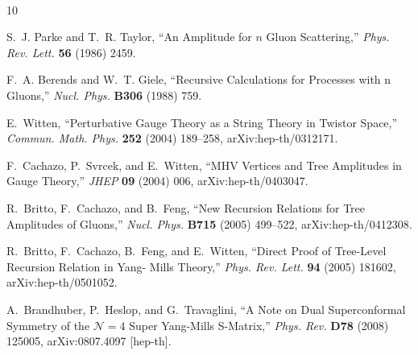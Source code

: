 \documentclass[11pt, reqno]{article}
\begin{document}
~\newpage~\newpage
~\vspace{0.2cm}~

%
%
%


\providecommand{\href}[2]{#2}\begingroup\raggedright\begin{thebibliography}{10}

S.~J. Parke and T.~R. Taylor, ``{An Amplitude for $n$ Gluon Scattering},''
\href{http://dx.doi.org/10.1103/PhysRevLett.56.2459}{{\em Phys. Rev. Lett.}
  {\bf 56} (1986)  2459}.

F.~A. Berends and W.~T. Giele, ``{Recursive Calculations for Processes with n
  Gluons},''
\href{http://dx.doi.org/10.1016/0550-3213(88)90442-7}{{\em Nucl. Phys.} {\bf
  B306} (1988)  759}.

E.~Witten, ``{Perturbative Gauge Theory as a String Theory in Twistor Space},''
  \href{http://dx.doi.org/10.1007/s00220-004-1187-3}{{\em Commun. Math. Phys.}
  {\bf 252} (2004)  189--258},
\href{http://arxiv.org/abs/hep-th/0312171}{{ arXiv:hep-th/0312171}}.

F.~Cachazo, P.~Svrcek, and E.~Witten, ``{MHV Vertices and Tree Amplitudes in
  Gauge Theory},'' \href{http://dx.doi.org/10.1088/1126-6708/2004/09/006}{{\em
  JHEP} {\bf 09} (2004)  006},
\href{http://arxiv.org/abs/hep-th/0403047}{{ arXiv:hep-th/0403047}}.

R.~Britto, F.~Cachazo, and B.~Feng, ``{New Recursion Relations for Tree
  Amplitudes of Gluons},''
  \href{http://dx.doi.org/10.1016/j.nuclphysb.2005.02.030}{{\em Nucl. Phys.}
  {\bf B715} (2005)  499--522},
\href{http://arxiv.org/abs/hep-th/0412308}{{ arXiv:hep-th/0412308}}.

R.~Britto, F.~Cachazo, B.~Feng, and E.~Witten, ``{Direct Proof of Tree-Level
  Recursion Relation in Yang- Mills Theory},''
  \href{http://dx.doi.org/10.1103/PhysRevLett.94.181602}{{\em Phys. Rev. Lett.}
  {\bf 94} (2005)  181602},
\href{http://arxiv.org/abs/hep-th/0501052}{{ arXiv:hep-th/0501052}}.

A.~Brandhuber, P.~Heslop, and G.~Travaglini, ``{A Note on Dual Superconformal
  Symmetry of the $\mathcal{N}=4$ Super Yang-Mills S-Matrix},''
  \href{http://dx.doi.org/10.1103/PhysRevD.78.125005}{{\em Phys. Rev.} {\bf
  D78} (2008)  125005},
\href{http://arxiv.org/abs/0807.4097}{{ arXiv:0807.4097 [hep-th]}}.


\end{thebibliography}
\end{document}
